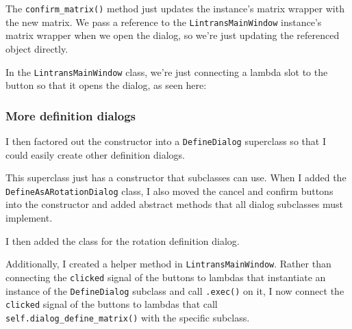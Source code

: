 \documentclass[../development.tex]{subfiles}
\begin{document}
The \texttt{confirm_matrix()} method just updates the instance's matrix wrapper with the new matrix. We pass a reference to the \texttt{LintransMainWindow} instance's matrix wrapper when we open the dialog, so we're just updating the referenced object directly.

In the \texttt{LintransMainWindow} class, we're just connecting a lambda slot to the button so that it opens the dialog, as seen here:


\subsubsection{More definition dialogs\label{development:initial-gui:more-definition-dialogs}}

I then factored out the constructor into a \texttt{DefineDialog} superclass so that I could easily create other definition dialogs.


This superclass just has a constructor that subclasses can use. When I added the \texttt{DefineAsARotationDialog} class, I also moved the cancel and confirm buttons into the constructor and added abstract methods that all dialog subclasses must implement.


I then added the class for the rotation definition dialog.



Additionally, I created a helper method in \texttt{LintransMainWindow}. Rather than connecting the \texttt{clicked} signal of the buttons to lambdas that instantiate an instance of the \texttt{DefineDialog} subclass and call \texttt{.exec()} on it, I now connect the \texttt{clicked} signal of the buttons to lambdas that call \texttt{self.dialog_define_matrix()} with the specific subclass.
\end{document}

